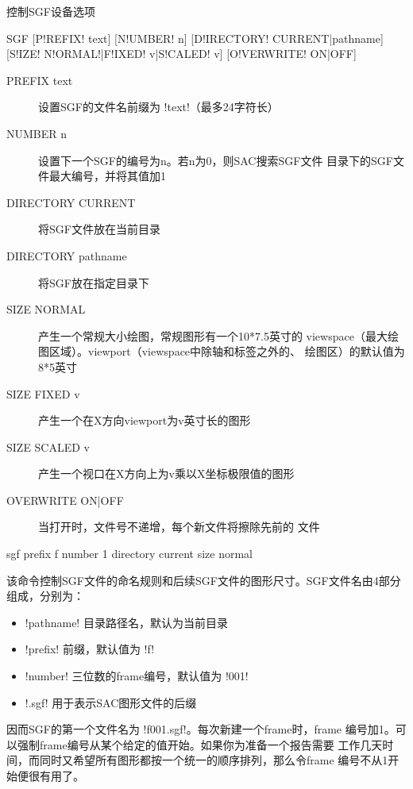 \label{cmd:sgf}

控制SGF设备选项

\begin{SACSTX}
SGF [P!REFIX! text] [N!UMBER! n] [D!IRECTORY! CURRENT|pathname]
    [S!IZE! N!ORMAL!|F!IXED! v|S!CALED! v] [O!VERWRITE! ON|OFF]
\end{SACSTX}

\begin{description}
\item [PREFIX text] 设置SGF的文件名前缀为 !text!（最多24字符长）
\item [NUMBER n] 设置下一个SGF的编号为n。若n为0，则SAC搜索SGF文件
    目录下的SGF文件最大编号，并将其值加1
\item [DIRECTORY CURRENT] 将SGF文件放在当前目录
\item [DIRECTORY pathname] 将SGF放在指定目录下
\item [SIZE NORMAL] 产生一个常规大小绘图，常规图形有一个10*7.5英寸的
    viewspace（最大绘图区域）。viewport（viewspace中除轴和标签之外的、
    绘图区）的默认值为8*5英寸
\item [SIZE FIXED v] 产生一个在X方向viewport为v英寸长的图形
\item [SIZE SCALED v] 产生一个视口在X方向上为v乘以X坐标极限值的图形
\item [OVERWRITE ON|OFF] 当打开时，文件号不递增，每个新文件将擦除先前的
    文件
\end{description}

\begin{SACDFT}
sgf prefix f number 1 directory current size normal
\end{SACDFT}

该命令控制SGF文件的命名规则和后续SGF文件的图形尺寸。SGF文件名由4部分
组成，分别为：
\begin{itemize}
\item !pathname! 目录路径名，默认为当前目录
\item !prefix! 前缀，默认值为 !f!
\item !number! 三位数的frame编号，默认值为 !001!
\item !.sgf! 用于表示SAC图形文件的后缀
\end{itemize}
因而SGF的第一个文件名为 !f001.sgf!。每次新建一个frame时，frame
编号加1。可以强制frame编号从某个给定的值开始。如果你为准备一个报告需要
工作几天时间，而同时又希望所有图形都按一个统一的顺序排列，那么令frame
编号不从1开始便很有用了。

